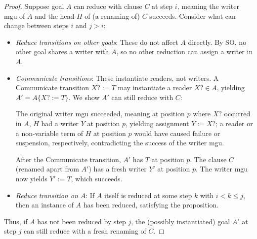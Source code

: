 \begin{proof}
Suppose goal $A$ can reduce with clause $C$ at step $i$, meaning the writer mgu of $A$ and the head $H$ of (a renaming of) $C$ succeeds. Consider what can change between steps $i$ and $j > i$:
\begin{itemize}
    \item \emph{Reduce transitions on other goals}: These do not affect $A$ directly. By SO, no other goal shares a writer with $A$, so no other reduction can assign a writer in $A$.

    \item \emph{Communicate transitions}: These instantiate readers, not writers. A Communicate transition $X? := T$ may instantiate a reader $X? \in A$, yielding $A' = A\{X? := T\}$. We show $A'$ can still reduce with $C$:

    The original writer mgu succeeded, meaning at position $p$ where $X?$ occurred in $A$, $H$ had a writer $Y$ at position $p$, yielding assignment $Y := X?$; a reader or a non-variable term of $H$ at position $p$ would have caused failure or suspension, respectively, contradicting the success of the writer mgu.

    After the Communicate transition, $A'$ has $T$ at position $p$. The clause $C$ (renamed apart from $A'$) has a fresh writer $Y'$ at position $p$. The writer mgu now yields $Y' := T$, which succeeds.

    \item \emph{Reduce transition on $A$}: If $A$ itself is reduced at some step $k$ with $i < k \le j$, then an instance of $A$ has been reduced, satisfying the proposition.
\end{itemize}

Thus, if $A$ has not been reduced by step $j$, the (possibly instantiated) goal $A'$ at step $j$ can still reduce with a fresh renaming of $C$.
\end{proof}

\corSOGuards*

